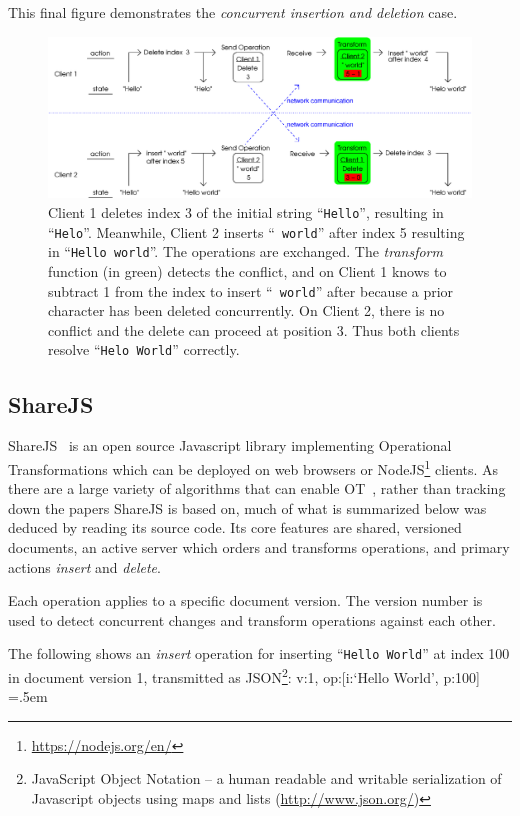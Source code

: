\documentclass[12pt,a4paper,twoside,openright]{report}
\newenvironment{lcverbatim}
 {\SaveVerbatim{cverb}}
 {\endSaveVerbatim
  \flushleft\fboxrule=0pt\fboxsep=.5em
  \colorbox{cverbbg}{%
    \makebox[\dimexpr\linewidth-2\fboxsep][l]{\BUseVerbatim{cverb}}%
  }
  \endflushleft
}
\begin{document}
	This final figure demonstrates the \textit{concurrent insertion and deletion} case.
	
	\begin{figure}[H]
	\centering
	\includegraphics[width=1\linewidth]{figs/ot3.eps}
	\caption[Operational Transformations --- concurrent insertion and deletion]{Client 1 deletes index 3 of the initial string ``\texttt{Hello}'', resulting in ``\texttt{Helo}''. Meanwhile, Client 2 inserts ``\texttt{ world}'' after index 5 resulting in ``\texttt{Hello world}''. The operations are exchanged. The \textit{transform} function (in green) detects the conflict, and on Client 1 knows to subtract 1 from the index to insert ``\texttt{ world}'' after because a prior character has been deleted concurrently. On Client 2, there is no conflict and the delete can proceed at position 3. Thus both clients resolve ``\texttt{Helo World}'' correctly.}
	\label{fig:ot3}
	\end{figure}

	\subsection{ShareJS} \label{sec:sharejs}
	
	ShareJS~\cite{sharejs} is an open source Javascript library implementing Operational Transformations which can be deployed on web browsers or NodeJS\footnote{\url{https://nodejs.org/en/}} clients. As there are a large variety of algorithms that can enable OT~\cite{kumawat2016}, rather than tracking down the papers ShareJS is based on, much of what is summarized below was deduced by reading its source code. Its core features are shared, versioned documents, an active server which orders and transforms operations, and primary actions \textit{insert} and \textit{delete}.
	
	Each operation applies to a specific document version. The version number is used to detect concurrent changes and transform operations against each other.
	
	The following shows an \textit{insert} operation for inserting ``\texttt{Hello World}'' at index 100 in document version 1, transmitted as JSON\footnote{JavaScript Object Notation -- a human readable and writable serialization of Javascript objects using maps and lists (\url{http://www.json.org/})}:
\begin{lcverbatim}
{v:1, op:[{i:`Hello World', p:100}]}
\end{lcverbatim}
\end{document}
